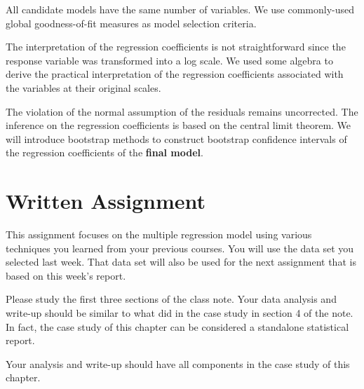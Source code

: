 \documentclass[
]{book}
\begin{document}
All candidate models have the same number of variables. We use commonly-used global goodness-of-fit measures as model selection criteria.

The interpretation of the regression coefficients is not straightforward since the response variable was transformed into a log scale. We used some algebra to derive the practical interpretation of the regression coefficients associated with the variables at their original scales.

The violation of the normal assumption of the residuals remains uncorrected. The inference on the regression coefficients is based on the central limit theorem. We will introduce bootstrap methods to construct bootstrap confidence intervals of the regression coefficients of the \textbf{final model}.

\hypertarget{written-assignment}{%
\section{Written Assignment}\label{written-assignment}}

This assignment focuses on the multiple regression model using various techniques you learned from your previous courses. You will use the data set you selected last week. That data set will also be used for the next assignment that is based on this week's report.

Please study the first three sections of the class note. Your data analysis and write-up should be similar to what did in the case study in section 4 of the note. In fact, the case study of this chapter can be considered a standalone statistical report.

Your analysis and write-up should have all components in the case study of this chapter.
\end{document}
